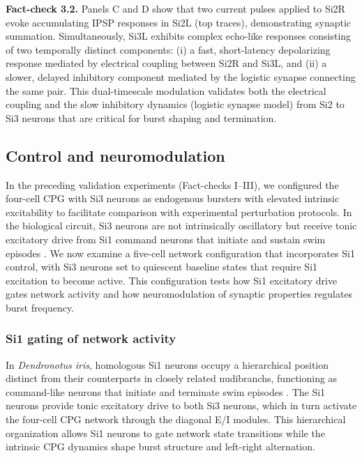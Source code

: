 \documentclass[nofootinbib,aip,amsmath,amssymb,preprint,twocolumn,floatfix,10pt]{revtex4-2}
\begin{document}
{\bf Fact-check 3.2.}
Panels C and D show that two current pulses applied to Si2R evoke accumulating IPSP responses in Si2L (top traces), demonstrating synaptic summation. Simultaneously, Si3L exhibits complex echo-like responses consisting of two temporally distinct components: (i) a fast, short-latency depolarizing response mediated by electrical coupling between Si2R and Si3L, and (ii) a slower, delayed inhibitory component mediated by the logistic synapse connecting the same pair. This dual-timescale modulation validates both the electrical coupling and the slow inhibitory dynamics (logistic synapse model) from Si2 to Si3 neurons that are critical for burst shaping and termination.


\subsection{Control and neuromodulation}

In the preceding validation experiments (Fact-checks I--III), we configured the four-cell CPG with Si3 neurons as endogenous bursters with elevated intrinsic excitability to facilitate comparison with experimental perturbation protocols. In the biological circuit, Si3 neurons are not intrinsically oscillatory but receive tonic excitatory drive from Si1 command neurons that initiate and sustain swim episodes \cite{sakurai2019command}. We now examine a five-cell network configuration that incorporates Si1 control, with Si3 neurons set to quiescent baseline states that require Si1 excitation to become active. This configuration tests how Si1 excitatory drive gates network activity and how neuromodulation of synaptic properties regulates burst frequency.

\subsubsection{Si1 gating of network activity}

In \textit{Dendronotus iris}, homologous Si1 neurons occupy a hierarchical position distinct from their counterparts in closely related nudibranchs, functioning as command-like neurons that initiate and terminate swim episodes \cite{sakurai2019command}. The Si1 neurons provide tonic excitatory drive to both Si3 neurons, which in turn activate the four-cell CPG network through the diagonal E/I modules. This hierarchical organization allows Si1 neurons to gate network state transitions while the intrinsic CPG dynamics shape burst structure and left-right alternation.
\end{document}
